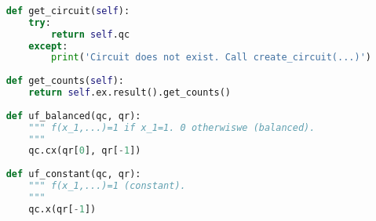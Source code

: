 \begin{lstlisting}[language=Python]
    
    def get_circuit(self):
        try:
            return self.qc
        except:
            print('Circuit does not exist. Call create_circuit(...)')
    
    def get_counts(self):
        return self.ex.result().get_counts()
                
    def uf_balanced(qc, qr):
        """ f(x_1,...)=1 if x_1=1. 0 otherwiswe (balanced).
        """
        qc.cx(qr[0], qr[-1])
        
    def uf_constant(qc, qr):
        """ f(x_1,...)=1 (constant).
        """
        qc.x(qr[-1])  
\end{lstlisting}